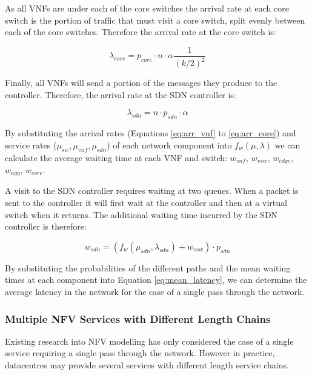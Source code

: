 As all VNFs are under each of the core switches the arrival rate at each core switch is the portion of traffic that must visit a core switch, split evenly between each of the core switches. Therefore the arrival rate at the core switch is:

\begin{equation}
\label{eq:arr_core}
\lambda_{core} = p_{core} \cdot n \cdot \alpha \frac{1}{(k / 2)^2}
\end{equation}

Finally, all VNFs will send a portion of the messages they produce to the controller. Therefore, the arrival rate at the SDN controller is:

\begin{equation}
\label{eq:arr_sdn}
\lambda_{sdn} = n \cdot p_{sdn} \cdot \alpha
\end{equation}

By substituting the arrival rates (Equations \ref{eq:arr_vnf} to \ref{eq:arr_core}) and service rates ($\mu_{sw}, \mu_{vnf}, \mu_{sdn}$) of each network component into $f_w(\mu, \lambda)$ we can calculate the average waiting time at each VNF and switch: $w_{vnf}$, $w_{vsw}$, $w_{edge}$, $w_{agg}$, $w_{core}$.

A visit to the SDN controller requires waiting at two queues. When a packet is sent to the controller it will first wait at the controller and then at a virtual switch when it returns. The additional waiting time incurred by the SDN controller is therefore:

\begin{equation}
\label{eq:wait_sdn}
w_{sdn} = (f_w(\mu_{sdn}, \lambda_{sdn}) + w_{vsw}) \cdot p_{sdn}
\end{equation}

By substituting the probabilities of the different paths and the mean waiting times at each component into Equation \ref{eq:mean_latency}, we can determine the average latency in the network for the case of a single pass through the network.

\subsubsection{Multiple NFV Services with Different Length Chains}
Existing research into NFV modelling has only considered the case of a single service requiring a single pass through the network. However in practice, datacentres may provide several services with different length service chains.

